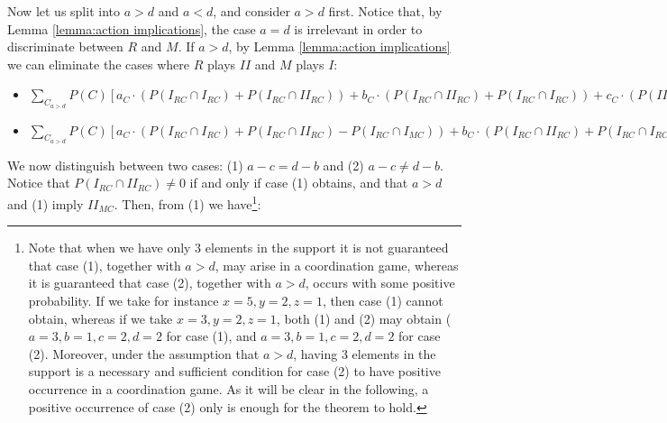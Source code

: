 \documentclass[fleqn,reqno,11pt]{article}
\begin{document}
\noindent Now let us split into $a>d$ and $a<d$, and consider $a>d$ first.
Notice that, by Lemma \ref{lemma:action implications}, the case $a=d$ is irrelevant in order to
discriminate between $R$ and $M$. If $a>d$, by Lemma \ref{lemma:action implications} we can eliminate
the cases where $R$ plays $II$ and $M$ plays $I$:

\begin{itemize}

\item $\sum_{C_{a>d}} P(C)[a_{C} \cdot (P(I_{RC}\cap I_{RC}) + P(I_{RC}\cap II_{RC})) + b_{C} \cdot  (P(I_{RC}\cap II_{RC}) + P(I_{RC}\cap I_{RC})) + c_{C} \cdot (P(II_{RC}\cap I_{RC}) +P(II_{RC}\cap II_{RC})) + d_{C} \cdot (P(II_{RC}\cap II_{RC})+P(II_{RC}\cap I_{RC}))]> 
\sum_{C_{a>d}} P(C)[a_{C} \cdot P(I_{RC}\cap I_{MC}) + b_{C} \cdot P(I_{RC}\cap I_{MC}) + c_{C} \cdot (P(I_{RC}\cap II_{MC})+P(II_{RC}\cap II_{MC})) + d_{C} \cdot (P(II_{RC}\cap II_{MC})+P(I_{RC}\cap II_{MC}))]$

\item $\sum_{C_{a>d}} P(C)[a_{C} \cdot (P(I_{RC}\cap I_{RC}) + P(I_{RC}\cap II_{RC})- P(I_{RC}\cap I_{MC})) + b_{C} \cdot  (P(I_{RC}\cap II_{RC}) + P(I_{RC}\cap I_{RC})- P(I_{RC}\cap I_{MC})) + c_{C} \cdot (P(II_{RC}\cap I_{RC}) +P(II_{RC}\cap II_{RC})- P(I_{RC}\cap II_{MC})- P(II_{RC}\cap II_{MC})) + d_{C} \cdot (P(II_{RC}\cap II_{RC})+P(II_{RC}\cap I_{RC})- P(II_{RC}\cap II_{MC})- P(I_{RC}\cap II_{MC}))]> 0$

\end{itemize}

\noindent We now distinguish between two cases: (1) $ a-c = d-b $ and (2) $  a-c \neq d-b $. Notice that $P(I_{RC}\cap II_{RC}) \neq 0$ if and only if case (1) obtains, and that $a>d$ and (1) imply $II_{MC}$. Then, from (1) we have\footnote{Note that when we have only 3 elements in the support it is not guaranteed that case (1), together with $a>d$, may arise in a coordination game, whereas it is guaranteed that case (2), together with $a>d$, occurs with some positive probability. If we take for instance $x= 5, y= 2, z= 1$, then case (1) cannot obtain, whereas if we take $x= 3, y= 2, z= 1$, both (1) and (2) may obtain ($a=3, b=1, c=2, d=2$ for case (1), and $a=3, b=1, c=2, d=2$ for case (2). Moreover, under the assumption that $a>d$, having 3 elements in the support is a necessary and sufficient condition for case (2) to have positive occurrence in a coordination game. As it will be clear in the following, a positive occurrence of case (2) only is enough for the theorem to hold.}:
\end{document}
